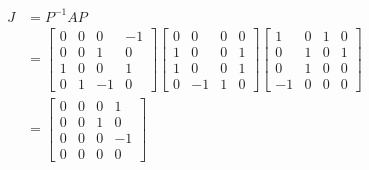 \begin{align*}
    J &= P^{-1}AP\\ &= \begin{bmatrix}
        0&0&0&-1 \\ 0&0&1&0 \\ 1&0&0&1 \\ 0&1&-1&0
    \end{bmatrix}
    \begin{bmatrix}
        0&0&0&0 \\ 1&0&0&1 \\ 1&0&0&1 \\ 0&-1&1&0
    \end{bmatrix}
    \begin{bmatrix}
        1&0&1&0\\
        0&1&0&1\\
        0&1&0&0\\
        -1&0&0&0
    \end{bmatrix}\\
    &= \begin{bmatrix}
        0&0&0&1\\ 0&0&1&0 \\ 0&0&0&-1 \\ 0&0&0&0
    \end{bmatrix}
\end{align*}